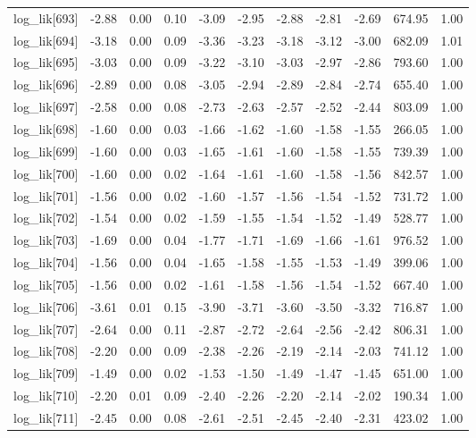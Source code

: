 \begin{table}[ht]
\begin{tabular}{rrrrrrrrrrr}
  log\_lik[693] & -2.88 & 0.00 & 0.10 & -3.09 & -2.95 & -2.88 & -2.81 & -2.69 & 674.95 & 1.00 \\ 
  log\_lik[694] & -3.18 & 0.00 & 0.09 & -3.36 & -3.23 & -3.18 & -3.12 & -3.00 & 682.09 & 1.01 \\ 
  log\_lik[695] & -3.03 & 0.00 & 0.09 & -3.22 & -3.10 & -3.03 & -2.97 & -2.86 & 793.60 & 1.00 \\ 
  log\_lik[696] & -2.89 & 0.00 & 0.08 & -3.05 & -2.94 & -2.89 & -2.84 & -2.74 & 655.40 & 1.00 \\ 
  log\_lik[697] & -2.58 & 0.00 & 0.08 & -2.73 & -2.63 & -2.57 & -2.52 & -2.44 & 803.09 & 1.00 \\ 
  log\_lik[698] & -1.60 & 0.00 & 0.03 & -1.66 & -1.62 & -1.60 & -1.58 & -1.55 & 266.05 & 1.00 \\ 
  log\_lik[699] & -1.60 & 0.00 & 0.03 & -1.65 & -1.61 & -1.60 & -1.58 & -1.55 & 739.39 & 1.00 \\ 
  log\_lik[700] & -1.60 & 0.00 & 0.02 & -1.64 & -1.61 & -1.60 & -1.58 & -1.56 & 842.57 & 1.00 \\ 
  log\_lik[701] & -1.56 & 0.00 & 0.02 & -1.60 & -1.57 & -1.56 & -1.54 & -1.52 & 731.72 & 1.00 \\ 
  log\_lik[702] & -1.54 & 0.00 & 0.02 & -1.59 & -1.55 & -1.54 & -1.52 & -1.49 & 528.77 & 1.00 \\ 
  log\_lik[703] & -1.69 & 0.00 & 0.04 & -1.77 & -1.71 & -1.69 & -1.66 & -1.61 & 976.52 & 1.00 \\ 
  log\_lik[704] & -1.56 & 0.00 & 0.04 & -1.65 & -1.58 & -1.55 & -1.53 & -1.49 & 399.06 & 1.00 \\ 
  log\_lik[705] & -1.56 & 0.00 & 0.02 & -1.61 & -1.58 & -1.56 & -1.54 & -1.52 & 667.40 & 1.00 \\ 
  log\_lik[706] & -3.61 & 0.01 & 0.15 & -3.90 & -3.71 & -3.60 & -3.50 & -3.32 & 716.87 & 1.00 \\ 
  log\_lik[707] & -2.64 & 0.00 & 0.11 & -2.87 & -2.72 & -2.64 & -2.56 & -2.42 & 806.31 & 1.00 \\ 
  log\_lik[708] & -2.20 & 0.00 & 0.09 & -2.38 & -2.26 & -2.19 & -2.14 & -2.03 & 741.12 & 1.00 \\ 
  log\_lik[709] & -1.49 & 0.00 & 0.02 & -1.53 & -1.50 & -1.49 & -1.47 & -1.45 & 651.00 & 1.00 \\ 
  log\_lik[710] & -2.20 & 0.01 & 0.09 & -2.40 & -2.26 & -2.20 & -2.14 & -2.02 & 190.34 & 1.00 \\ 
  log\_lik[711] & -2.45 & 0.00 & 0.08 & -2.61 & -2.51 & -2.45 & -2.40 & -2.31 & 423.02 & 1.00 \\ 

\end{tabular}
\end{table}
